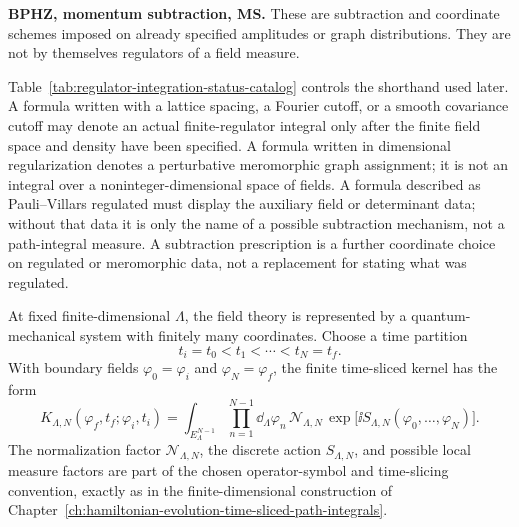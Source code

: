 \begin{table}[H]
\begin{minipage}{0.94\textwidth}
\textbf{BPHZ, momentum subtraction, MS.}
These are subtraction and coordinate schemes imposed on already specified
amplitudes or graph distributions.  They are not by themselves regulators of
a field measure.
\end{minipage}
\caption{Regulator and subtraction classes used in the monograph.  The
catalog names the object that exists before a limit is taken or before a
formal expansion is interpreted, and separates cutoff measures from regulated
covariances, operator-insertion regulators, Pauli--Villars auxiliary
determinants, dimensional regularization, and subtraction prescriptions.}
\label{tab:regulator-integration-status-catalog}
\end{table}

Table~\ref{tab:regulator-integration-status-catalog} controls the shorthand
used later.  A formula written with a lattice spacing, a Fourier cutoff, or a
smooth covariance cutoff may denote an actual finite-regulator integral only
after the finite field space and density have been specified.  A formula
written in dimensional regularization denotes a perturbative meromorphic graph
assignment; it is not an integral over a noninteger-dimensional space of
fields.  A formula described as Pauli--Villars regulated must display the
auxiliary field or determinant data; without that data it is only the name of
a possible subtraction mechanism, not a path-integral measure.  A subtraction
prescription is a further coordinate choice on regulated or meromorphic data,
not a replacement for stating what was regulated.

\begin{definition}
\label{def:finite-regulator-time-sliced-scalar-kernel}
At fixed finite-dimensional \(\Lambda\), the field theory is represented by a
quantum-mechanical system with finitely many coordinates.  Choose a time
partition
\[
  t_i=t_0<t_1<\cdots<t_N=t_f.
\]
With boundary fields \(\varphi_0=\varphi_i\) and
\(\varphi_N=\varphi_f\), the finite time-sliced kernel has the form
\[
  K_{\Lambda,N}(\varphi_f,t_f;\varphi_i,t_i)
  =
  \int_{E_\Lambda^{N-1}}
  \prod_{n=1}^{N-1}\dd_\Lambda\varphi_n\,
  \mathcal N_{\Lambda,N}\,
  \exp\bigl[\ii S_{\Lambda,N}(\varphi_0,\ldots,\varphi_N)\bigr].
\]
The normalization factor \(\mathcal N_{\Lambda,N}\), the discrete action
\(S_{\Lambda,N}\), and possible local measure factors are part of the chosen
operator-symbol and time-slicing convention, exactly as in the
finite-dimensional construction of
Chapter~\ref{ch:hamiltonian-evolution-time-sliced-path-integrals}.
\end{definition}

